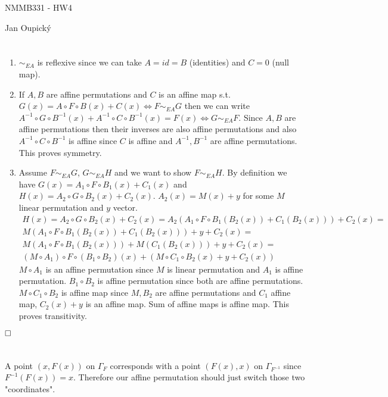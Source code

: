 \documentclass[12pt, a4paper]{article}
\newcommand{\qed}{\hfill\square}
\begin{document}
\begin{center}
\large NMMB331 - HW4

\normalsize Jan Oupický
\end{center}
\vspace{1\baselineskip}

\section{}
\begin{enumerate}
    \item $\sim_{EA}$ is reflexive since we can take $A=id=B$ (identities) and $C = 0$ (null map).
    \item If $A,B$ are affine permutations and $C$ is an affine map s.t. $G(x)= A \circ F \circ B (x) + C(x) \iff F \sim_{EA} G$ then we can write $A^{-1}\circ G \circ B^{-1} (x) + A^{-1}\circ C \circ B^{-1} (x) = F(x) \iff G \sim_{EA} F$. Since $A,B$ are affine permutations then their inverses are also affine permutations and also $A^{-1}\circ C \circ B^{-1}$ is affine since $C$ is affine and $A^{-1},B^{-1}$ are affine permutations. This proves symmetry.
    \item Assume $F \sim_{EA} G$, $G \sim_{EA} H$ and we want to show $F \sim_{EA} H$. By definition we have $G(x)= A_1 \circ F \circ B_1 (x) + C_1(x)$ and $H(x) = A_2 \circ G \circ B_2 (x) + C_2(x)$. $A_2(x) = M(x)+y$ for some $M$ linear permutation and $y$ vector.
    \begin{gather*}
    H(x) = A_2 \circ G \circ B_2 (x) + C_2(x) = A_2 (A_1 \circ F \circ B_1 (B_2(x)) + C_1(B_2(x))) + C_2(x) =\\
    M(A_1 \circ F \circ B_1 (B_2(x)) + C_1(B_2(x))) + y + C_2(x) =\\
    M(A_1 \circ F \circ B_1 (B_2(x))) + M(C_1(B_2(x))) + y + C_2(x) = \\
    (M \circ A_1) \circ F \circ (B_1 \circ B_2)(x) + (M \circ C_1 \circ B_2(x) + y + C_2(x))
    \end{gather*}
    $M \circ A_1$ is an affine permutation since $M$ is linear permutation and $A_1$ is affine permutation. $B_1 \circ B_2$ is affine permutation since both are affine permutations. $M \circ C_1 \circ B_2$ is affine map since $M, B_2$ are affine permutations and $C_1$ affine map, $C_2(x)+y$ is an affine map. Sum of affine maps is affine map. This proves transitivity.
\end{enumerate}
$\qed$

\section{}
A point $(x,F(x))$ on $\Gamma_F$ corresponds with a point $(F(x),x)$ on $\Gamma_{F^{-1}}$ since $F^{-1}(F(x)) = x$. Therefore our affine permutation should just switch those two "coordinates". 
\end{document}
